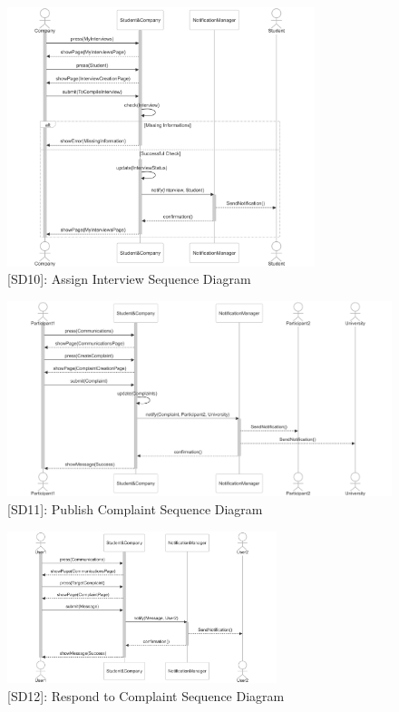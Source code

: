 \begin{figure}
    \centering
    \includegraphics[width=0.8\textwidth]{Latex/Images/RASD/SequenceDiagrams/AssignInterviewSequenceDiagram.png}
    \caption{[SD10]: Assign Interview Sequence Diagram}
    \label{fig:SD10}
\end{figure}
\clearpage

\begin{figure}
    \centering
    \includegraphics[width=1\textwidth]{Latex/Images/RASD/SequenceDiagrams/PublishComplaintSequenceDiagram.png}
    \caption{[SD11]: Publish Complaint Sequence Diagram}
    \label{fig:SD11}
\end{figure}

\begin{figure}
    \centering
    \includegraphics[width=0.7\textwidth]{Latex/Images/RASD/SequenceDiagrams/RespondToComplaintSequenceDiagram.png}
    \caption{[SD12]: Respond to Complaint Sequence Diagram}
    \label{fig:SD12}
\end{figure}

